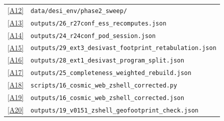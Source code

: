 \documentclass[aps,prd,twocolumn,superscriptaddress,showpacs,preprintnumbers,nofootinbib,longbibliography,floatfix]{revtex4-2}
\newcommand{\repoBase}{https://github.com/Hubify-Projects/bigbounce/blob/main}
\begin{document}
\begin{table}[p]
{\begin{ruledtabular}
\begin{tabular}{lp{}}
\href{\repoBase/pipelines/p5\_desi\_chirality/data/desi\_env/phase2\_sweep}{[A12]} & \texttt{data/desi\_env/phase2\_sweep/} \\
\href{\repoBase/pipelines/p5\_desi\_chirality/outputs/26\_r27conf\_ess\_recomputes.json}{[A13]} & \texttt{outputs/26\_r27conf\_ess\_recomputes.json} \\
\href{\repoBase/pipelines/p5\_desi\_chirality/outputs/24\_r24conf\_pod\_session.json}{[A14]} & \texttt{outputs/24\_r24conf\_pod\_session.json} \\
\href{\repoBase/pipelines/p5\_desi\_chirality/outputs/29\_ext3\_desivast\_footprint\_retabulation.json}{[A15]} & \texttt{outputs/29\_ext3\_desivast\_footprint\_retabulation.json} \\
\href{\repoBase/pipelines/p5\_desi\_chirality/outputs/28\_ext1\_desivast\_program\_split.json}{[A16]} & \texttt{outputs/28\_ext1\_desivast\_program\_split.json} \\
\href{\repoBase/pipelines/p5\_desi\_chirality/outputs/25\_completeness\_weighted\_rebuild.json}{[A17]} & \texttt{outputs/25\_completeness\_weighted\_rebuild.json} \\
\href{\repoBase/pipelines/p5\_desi\_chirality/scripts/16\_cosmic\_web\_zshell\_corrected.py}{[A18]} & \texttt{scripts/16\_cosmic\_web\_zshell\_corrected.py} \\
\href{\repoBase/pipelines/p5\_desi\_chirality/outputs/16\_cosmic\_web\_zshell\_corrected.json}{[A19]} & \texttt{outputs/16\_cosmic\_web\_zshell\_corrected.json} \\
\href{\repoBase/pipelines/p5\_desi\_chirality/outputs/19\_v0151\_zshell\_geofootprint\_check.json}{[A20]} & \texttt{outputs/19\_v0151\_zshell\_geofootprint\_check.json} \\
\end{tabular}
\end{ruledtabular}
}%
\end{table}
\end{document}
